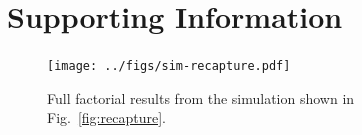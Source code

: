 \documentclass[12pt,english]{article}
\begin{document}
\section{Supporting Information}

\renewcommand{\thefigure}{S\arabic{figure}}
\renewcommand{\thetable}{S\arabic{table}}
\setcounter{figure}{0}
\setcounter{table}{0}

\begin{figure}[htb]
\begin{center}
  \texttt{[image: ../figs/sim-recapture.pdf]}
\caption{
  Full factorial results from the simulation shown in Fig.~\ref{fig:recapture}.
}
\label{fig:recapture-factorial}
\end{center}
\end{figure}
\end{document}
